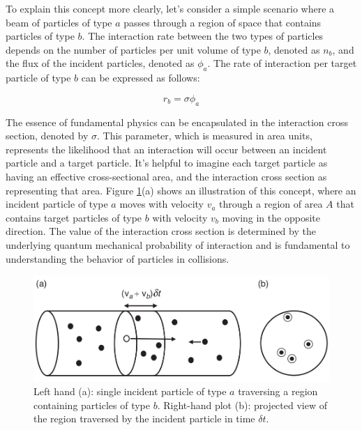 To explain this concept more clearly, let's consider a simple scenario where a beam of particles of type $a$ passes through a region of space that contains particles of type $b$. The interaction rate between the two types of particles depends on the number of particles per unit volume of type $b$, denoted as $n_{b}$, and the flux of the incident particles, denoted as $\phi_{a}$. The rate of interaction per target particle of type $b$ can be expressed as follows:

\begin{equation*}
  r_{b}=\sigma \phi_{a}
\end{equation*}

The essence of fundamental physics can be encapsulated in the interaction cross section, denoted by $\sigma$. This parameter, which is measured in area units, represents the likelihood that an interaction will occur between an incident particle and a target particle. It's helpful to imagine each target particle as having an effective cross-sectional area, and the interaction cross section as representing that area. Figure \ref{cross_section}(a) shows an illustration of this concept, where an incident particle of type $a$ moves with velocity $v_{a}$ through a region of area $A$ that contains target particles of type $b$ with velocity $v_{b}$ moving in the opposite direction. The value of the interaction cross section is determined by the underlying quantum mechanical probability of interaction and is fundamental to understanding the behavior of particles in collisions. \cite{thomson_2013}

\begin{center}
  \begin{figure}[h!]
    \centering
\includegraphics[scale=.35]{Chapter1/cross_section.png} 
 \caption[Cross section illustration]{Left hand (a): single incident particle of type $a$ traversing a region containing particles of type $b$. Right-hand plot (b): projected view of the region traversed by the incident particle in time $\delta t$.}
    \label{cross_section}
  \end{figure}
\end{center}

